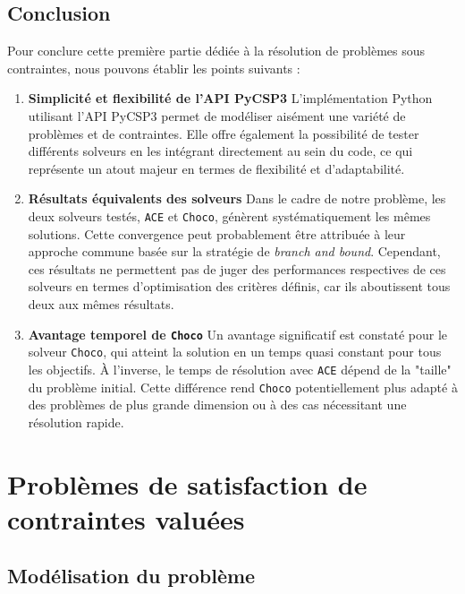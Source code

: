 \documentclass[12pt]{article}
\begin{document}
\subsection{Conclusion}

Pour conclure cette première partie dédiée à la résolution de problèmes sous contraintes, nous pouvons établir les points suivants :  
\begin{enumerate}
    \item \textbf{Simplicité et flexibilité de l’API PyCSP3}  
    L'implémentation Python utilisant l'API PyCSP3 permet de modéliser aisément une variété de problèmes et de contraintes. Elle offre 
    également la possibilité de tester différents solveurs en les intégrant directement au sein du code, ce qui représente un atout majeur 
    en termes de flexibilité et d'adaptabilité.
    
    \item \textbf{Résultats équivalents des solveurs}  
    Dans le cadre de notre problème, les deux solveurs testés, \texttt{ACE} et \texttt{Choco}, génèrent systématiquement 
    les mêmes solutions. Cette convergence peut probablement être attribuée à leur approche commune basée sur la stratégie 
    de \textit{branch and bound}. Cependant, ces résultats ne permettent pas de juger des performances respectives de ces 
    solveurs en termes d'optimisation des critères définis, car ils aboutissent tous deux aux mêmes résultats.

    \item \textbf{Avantage temporel de \texttt{Choco}}  
    Un avantage significatif est constaté pour le solveur \texttt{Choco}, qui atteint la solution en un temps quasi constant pour tous les 
    objectifs. À l'inverse, le temps de résolution avec \texttt{ACE} dépend de la "taille" du problème initial. Cette différence rend \texttt{Choco} 
    potentiellement plus adapté à des problèmes de plus grande dimension ou à des cas nécessitant une résolution rapide.
\end{enumerate}

\section{Problèmes de satisfaction de contraintes valuées}

\subsection{Modélisation du problème }
\end{document}

